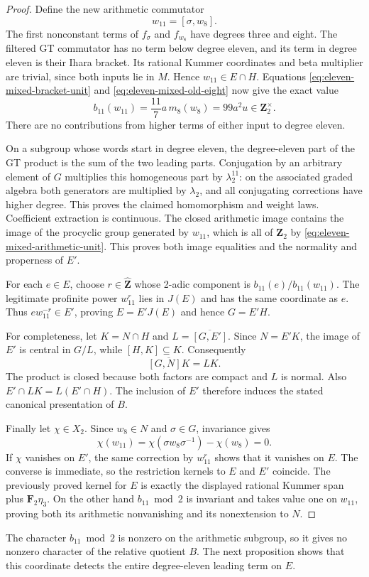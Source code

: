 \begin{proof}
Define the new arithmetic commutator
\[
 w_{11}=[\sigma,w_8].
\]
The first nonconstant terms of $f_\sigma$ and $f_{w_8}$ have
degrees three and eight. The filtered GT commutator has no term
below degree eleven, and its term in degree eleven is their
Ihara bracket. Its rational Kummer coordinates and beta multiplier
are trivial, since both inputs lie in $M$. Hence $w_{11}\in E\cap H$.
Equations \eqref{eq:eleven-mixed-bracket-unit} and
\eqref{eq:eleven-mixed-old-eight} now give the exact value
\begin{equation}\label{eq:eleven-mixed-arithmetic-unit}
 b_{11}(w_{11})
  =\frac{11}{7}a\,m_8(w_8)
  =99a^2u\in\mathbf Z_2^\times.
\end{equation}
There are no contributions from higher terms of either input to
degree eleven.

On a subgroup whose words start in degree eleven, the degree-eleven
part of the GT product is the sum of the two leading parts.
Conjugation by an arbitrary element of $G$ multiplies this
homogeneous part by $\lambda_2^{11}$: on the associated graded
algebra both generators are multiplied by $\lambda_2$, and all
conjugating corrections have higher degree. This proves the
claimed homomorphism and weight laws. Coefficient extraction is
continuous. The closed arithmetic image contains the image of the
procyclic group generated by $w_{11}$, which is all of $\mathbf Z_2$
by \eqref{eq:eleven-mixed-arithmetic-unit}. This proves both image
equalities and the normality and properness of $E'$.

For each $e\in E$, choose $r\in\widehat{\mathbf Z}$ whose
2-adic component is $b_{11}(e)/b_{11}(w_{11})$. The legitimate
profinite power $w_{11}^r$ lies in $J(E)$ and has the same
coordinate as $e$. Thus $e w_{11}^{-r}\in E'$, proving
$E=E'J(E)$ and hence $G=E'H$.

For completeness, let $K=N\cap H$ and
$L=\overline{[G,E']}$. Since $N=E'K$, the image of $E'$ is
central in $G/L$, while $[H,K]\subseteq K$. Consequently
\[
 \overline{[G,N]K}=LK.
\]
The product is closed because both factors are compact and $L$
is normal. Also $E'\cap LK=L(E'\cap H)$. The inclusion of $E'$
therefore induces the stated canonical presentation of $B$.

Finally let $\chi\in X_2$. Since $w_8\in N$ and $\sigma\in G$,
invariance gives
\[
 \chi(w_{11})=\chi(\sigma w_8\sigma^{-1})-\chi(w_8)=0.
\]
If $\chi$ vanishes on $E'$, the same correction by $w_{11}^r$
shows that it vanishes on $E$. The converse is immediate, so the
restriction kernels to $E$ and $E'$ coincide. The previously proved
kernel for $E$ is exactly the displayed rational Kummer span plus
$\mathbf F_2\eta_3$. On the other hand $b_{11}\bmod2$ is invariant
and takes value one on $w_{11}$, proving both its arithmetic
nonvanishing and its nonextension to $N$.
\end{proof}

\begin{remark}\label{rem:eleven-mixed-scope}
The character $b_{11}\bmod2$ is nonzero on the arithmetic subgroup,
so it gives no nonzero character of the relative quotient $B$.
The next proposition shows that this coordinate detects the entire
degree-eleven leading term on $E$.
\end{remark}
